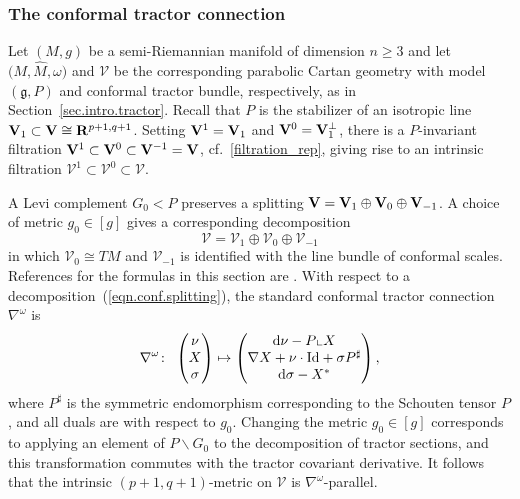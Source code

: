 \documentclass[10pt,a4paper]{amsart}
\numberwithin{equation}{section}
\theoremstyle{definition}
\newcommand{\BR}{{\bf R}}
\def\g{{\mathfrak g}}
\begin{document}
\subsubsection{The conformal tractor connection}
\label{sec.conf.tractor}

Let $(M,g)$ be a semi-Riemannian manifold of dimension $n \geq 3$ and let $\bigl(M, \hat{M}, \omega\bigr)$ and $\mathcal{V}$ be the corresponding parabolic Cartan geometry with model $(\g, P)$ and conformal tractor bundle, respectively, as in Section~\ref{sec.intro.tractor}. Recall that $P$ is the stabilizer of an isotropic line ${\bf V}_{1} \subset {\bf V} \cong \BR^{p+1,q+1}$. Setting ${\bf V}^{1} = {\bf V}_{1}$ and {${\bf V}^0 = {\bf V}_{1}^\perp$}, there is a $P$-invariant filtration
${{\bf V}^{1} \subset {\bf V}^0 \subset {\bf V}^{-1} = {\bf V}}$, cf.\ \eqref{filtration_rep}, giving rise to an intrinsic filtration $ \mathcal{V}^{1} \subset \mathcal{V}^0 \subset \mathcal{V}$.

A Levi complement $G_0 < P$ preserves a splitting ${\bf V} = {\bf V}_{1} \oplus {\bf V}_0 \oplus {\bf V}_{-1}$.
A choice of metric $g_0 \in [g]$ gives a corresponding decomposition
\begin{equation}
\label{eqn.conf.splitting}
\mathcal{V} = \mathcal{V}_{1} \oplus \mathcal{V}_0 \oplus \mathcal{V}_{-1}
\end{equation}
in which $\mathcal{V}_0 \cong TM$ and $\mathcal{V}_{-1}$ is identified with the line bundle of conformal scales.
References for the formulas in this section are \cite[equations~(22) and~(32)]{curry.gover.tractors}.
With respect to a decomposition~(\ref{eqn.conf.splitting}), the standard conformal tractor connection $\nabla^\omega$ is
\begin{equation}
\label{eqn.conf.connxn}
 \nabla^\omega \colon\ \begin{pmatrix} \nu \\ X \\ \sigma \end{pmatrix} \mapsto \begin{pmatrix} {\rm d} \nu - P \llcorner X \\ \nabla X + \nu \cdot {\rm Id} + \sigma P^\sharp \\ {\rm d} \sigma - X^* \end{pmatrix},
 \end{equation}
where $P^\sharp$ is the symmetric endomorphism corresponding to the Schouten tensor $P$, and all duals are with respect to $g_0$. Changing the metric $g_0 \in [g]$ corresponds to applying an element of $P \backslash G_0$ to the decomposition of tractor sections, and this transformation commutes with the tractor covariant derivative.
It follows that the intrinsic $(p+1,q+1)$-metric on $\mathcal{V}$ is $\nabla^\omega$-parallel.
\end{document}
